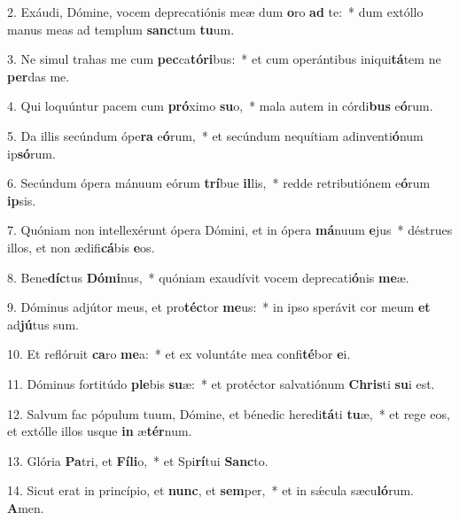 2. Exáudi, Dómine, vocem deprecatiónis meæ dum \textbf{o}ro \textbf{ad} te:~*  dum extóllo manus meas ad templum \textbf{sanc}tum \textbf{tu}um.\

3. Ne simul trahas me cum \textbf{pec}ca\textbf{tó}\textbf{ri}bus:~*  et cum operántibus iniqui\textbf{tá}tem ne \textbf{per}das me.\

4. Qui loquúntur pacem cum \textbf{pró}ximo \textbf{su}o,~*  mala autem in córdi\textbf{bus} e\textbf{ó}rum.\

5. Da illis secúndum ópe\textbf{ra} e\textbf{ó}rum,~*  et secúndum nequítiam adinventi\textbf{ó}num ip\textbf{só}rum.\

6. Secúndum ópera mánuum eórum \textbf{trí}bue \textbf{il}lis,~*  redde retributiónem e\textbf{ó}rum \textbf{ip}sis.\

7. Quóniam non intellexérunt ópera Dómini, et in ópera \textbf{má}nuum \textbf{e}jus~*  déstrues illos, et non ædifi\textbf{cá}bis \textbf{e}os.\

8. Bene\textbf{díc}tus \textbf{Dó}\textbf{mi}nus,~*  quóniam exaudívit vocem deprecati\textbf{ó}nis \textbf{me}æ.\

9. Dóminus adjútor meus, et pro\textbf{téc}tor \textbf{me}us:~*  in ipso sperávit cor meum \textbf{et} ad\textbf{jú}tus sum.\

10. Et reflóruit \textbf{ca}ro \textbf{me}a:~*  et ex voluntáte mea confi\textbf{té}bor \textbf{e}i.\

11. Dóminus fortitúdo \textbf{ple}bis \textbf{su}æ:~*  et protéctor salvatiónum \textbf{Chris}ti \textbf{su}i est.\

12. Salvum fac pópulum tuum, Dómine, et bénedic heredi\textbf{tá}ti \textbf{tu}æ,~*  et rege eos, et extólle illos usque \textbf{in} æ\textbf{tér}num.\

13. Glória \textbf{Pa}tri, et \textbf{Fí}\textbf{li}o,~*  et Spi\textbf{rí}tui \textbf{Sanc}to.\

14. Sicut erat in princípio, et \textbf{nunc}, et \textbf{sem}per,~*  et in sǽcula sæcu\textbf{ló}rum. \textbf{A}men.\

